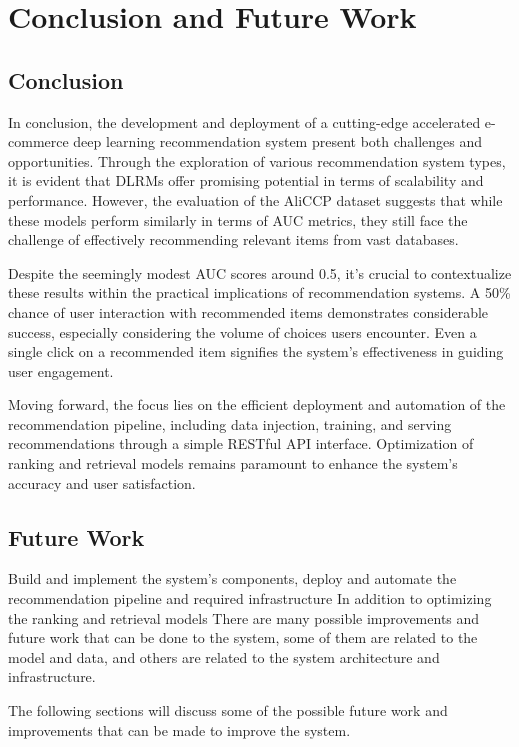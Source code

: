 \chapter{Conclusion and Future Work}
\minitoc

\section{Conclusion}
In conclusion, the development and deployment of a cutting-edge accelerated e-commerce deep learning recommendation system present both challenges and opportunities. Through the exploration of various recommendation system types, it is evident that DLRMs offer promising potential in terms of scalability and performance. However, the evaluation of the AliCCP dataset suggests that while these models perform similarly in terms of AUC metrics, they still face the challenge of effectively recommending relevant items from vast databases.

Despite the seemingly modest AUC scores around 0.5, it's crucial to contextualize these results within the practical implications of recommendation systems. A 50\% chance of user interaction with recommended items demonstrates considerable success, especially considering the volume of choices users encounter. Even a single click on a recommended item signifies the system's effectiveness in guiding user engagement.

Moving forward, the focus lies on the efficient deployment and automation of the recommendation pipeline, including data injection, training, and serving recommendations through a simple RESTful API interface. Optimization of ranking and retrieval models remains paramount to enhance the system's accuracy and user satisfaction.

\section{Future Work}
Build and implement the system's components, deploy and automate the recommendation pipeline and required infrastructure 
In addition to optimizing the ranking and retrieval models
There are many possible improvements and future work that can be done to the system, 
some of them are related to the model and data, and others are related to the system architecture and infrastructure.

The following sections will discuss some of the possible future work and improvements that can be made to improve the system.


